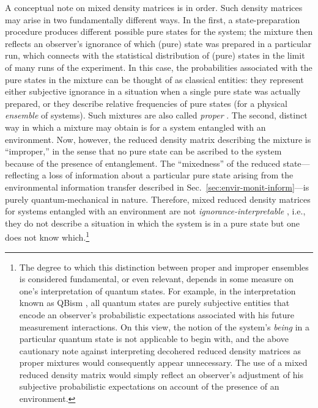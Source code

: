 \documentclass[3p,sort&compress,12pt]{elsarticle}
\begin{document}
A conceptual note on mixed density matrices is in order. Such density matrices may arise in two fundamentally different ways. In the first, a state-preparation procedure produces different possible pure states for the system; the mixture then reflects an observer's ignorance of which (pure) state was prepared in a particular run, which connects with the statistical distribution of (pure) states in the limit of many runs of the experiment. In this case, the probabilities associated with the pure states in the mixture can be thought of as classical entities: they represent either subjective ignorance in a situation when a single pure state was actually prepared, or they describe relative frequencies of pure states (for a physical \emph{ensemble} of systems). Such mixtures are also called \emph{proper} \cite{Espagnat:1966:mf,Espagnat:1988:cf,Espagnat:1995:ma,Schlosshauer:2003:tv,Schlosshauer:2007:un}. The second, distinct way in which a mixture may obtain is for a system entangled with an environment. Now, however, the reduced density matrix describing the mixture is ``improper,'' in the sense that no pure state can be ascribed to the system because of the presence of entanglement. The ``mixedness'' of the reduced state---reflecting a loss of information about a particular pure state arising from the environmental information transfer described in Sec.~\ref{sec:envir-monit-inform}---is purely quantum-mechanical in nature. Therefore, mixed reduced density matrices for systems entangled with an environment are not \emph{ignorance-interpretable} \cite{Espagnat:1966:mf,Espagnat:1988:cf,Espagnat:1995:ma,Schlosshauer:2003:tv,Schlosshauer:2007:un}, i.e., they do not describe a situation in which the system is in a pure state but one does not know which.\footnote{The degree to which this distinction between proper and improper ensembles is considered fundamental, or even relevant, depends in some measure on one's interpretation of quantum states. For example, in the interpretation known as QBism \cite{Fuchs:2014:pp}, all quantum states are purely subjective entities that encode an observer's probabilistic expectations associated with his future measurement interactions. On this view, the notion of the system's \emph{being} in a particular quantum state is not applicable to begin with, and the above cautionary note against interpreting decohered reduced density matrices as proper mixtures would consequently appear unnecessary. The use of a mixed reduced density matrix would simply reflect an observer's adjustment of his subjective probabilistic expectations on account of the presence of an environment.}
\end{document}
